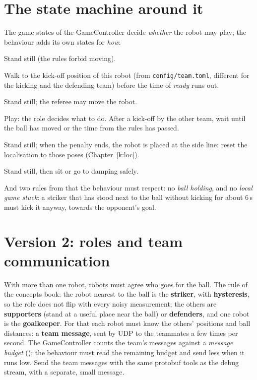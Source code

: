 \section*{The state machine around it}
The game states of the GameController decide \emph{whether} the robot may play; the behaviour adds its own states for \emph{how}:
\begin{description}[leftmargin=0.6cm,nosep]
  \item[initial] Stand still (the rules forbid moving).
  \item[ready] Walk to the kick-off position of this robot (from \texttt{config/team.toml}, different for the kicking and the defending team) before the time of \emph{ready} runs out.
  \item[set] Stand still; the referee may move the robot.
  \item[playing] Play: the role decides what to do. After a kick-off by the other team, wait until the ball has moved or the time from the rules has passed\guess.
  \item[penalised] Stand still; when the penalty ends, the robot is placed at the side line: reset the localisation to those poses (Chapter~\ref{k:loc}).
  \item[finished] Stand still, then sit or go to damping safely.
\end{description}
And two rules from  that the behaviour must respect: no \emph{ball holding}, and no \emph{local game stuck}: a striker that has stood next to the ball without kicking for about $6$\,s must kick it anyway, towards the opponent's goal.

\section*{Version 2: roles and team communication}
With more than one robot, robots must agree who goes for the ball. The rule of the concepts book: the robot nearest to the ball is the \textbf{striker}, with \textbf{hysteresis}, so the role does not flip with every noisy measurement; the others are \textbf{supporters} (stand at a useful place near the ball) or \textbf{defenders}, and one robot is the \textbf{goalkeeper}. For that each robot must know the others' positions and ball distances: a \textbf{team message}, sent by UDP to the teammates a few times per second. The GameController counts the team's messages against a \emph{message budget} (); the behaviour must read the remaining budget and send less when it runs low\guess. Send the team messages with the same protobuf tools as the debug stream, with a separate, small message.

